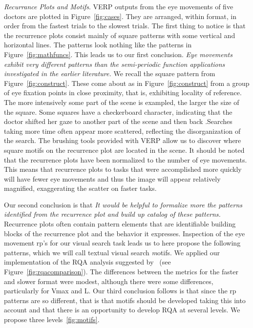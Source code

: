 \documentclass[journal]{vgtc}                %
\begin{document}
\emph{Recurrance Plots and Motifs}. VERP outputs from the eye movements of five doctors are
plotted in Figure~\ref{fig:cases}. They are arranged, within format, in order from the
fastest trials to the slowest trials. The first thing to notice is that the
recurrence plots consist mainly of square patterns with some vertical and horizontal lines. 
The patterns look nothing like the patterns in Figure~\ref{fig:mathfuncs}. This leads us to 
our first conclusion. \emph{Eye movements exhibit very different patterns than the semi-periodic 
function applications investigated in the earlier literature.} We recall the square
pattern from Figure~\ref{fig:construct}. These come about as in Figure~\ref{fig:construct} 
from a group of eye fixation points in close proximity, that is, exhibiting 
locality of reference. The more intensively some part of the scene is exampled, the
larger the size of the square. Some squares have a checkerboard character,
indicating that the doctor shifted her gaze to another part of the scene
and then back .Searches taking more time often  appear more
scattered, reflecting the disorganization of the search. The brushing 
tools provided with VERP allow us to discover where square motifs on 
the recurrence plot are located in the scene. It should be noted that the recurrence 
plots have been normalized to the number of eye movements. This means that recurrence plots
to tasks that were accomplished more quickly will have fewer eye movements
and thus the image will appear relatively magnified, exaggerating the
scatter on faster tasks. 

Our second conclusion is that \emph{It would be helpful to formalize more the patterns identified 
from the recurrence plot and build up catalog of these patterns.}
Recurrence plots often contain
pattern elements that are identifiable building blocks of the recurrence plot and the behavior it expresses. Inspection of the eye movement rp's for our visual search task leads us to here propose the following patterns,  which we will call textual visual search  {\emph motifs}. We applied our implementation of the RQA analysis suggested by~\cite{Anderson_2013} (see Figure~\ref{fig:rqacomparison}). The differences between the metrics for the faster and slower format were modest, although there were some differences, particularly for Vmax  and L. Our third conclusion follows is that since the rp patterns are so different, that is that motifs should be developed taking this into account and that there is an opportunity to 
develop RQA at several levels. We propose three levels~\ref{fig:motifs}.  
\end{document}
